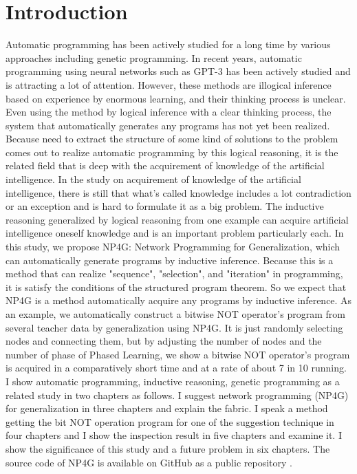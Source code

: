 \documentclass{article}
\begin{document}
\section{Introduction}
Automatic programming has been actively studied for a long time by various approaches including genetic programming.
In recent years, automatic programming using neural networks such as GPT-3\cite{gpt3} has been actively studied and is attracting a lot of attention.
However, these methods are illogical inference based on experience by enormous learning, and their thinking process is unclear.
Even using the method by logical inference with a clear thinking process, the system that automatically generates any programs has not yet been realized. 
Because need to extract the structure of some kind of solutions to the problem comes out to realize automatic programming by this logical reasoning, it is the related field that is deep with the acquirement of knowledge of the artificial intelligence.
In the study on acquirement of knowledge of the artificial intelligence, there is still that what's called knowledge includes a lot contradiction or an exception and is hard to formulate it as a big problem.
The inductive reasoning generalized by logical reasoning from one example can acquire artificial intelligence oneself knowledge and is an important problem particularly each.
In this study, we propose NP4G: Network Programming for Generalization, which can automatically generate programs by inductive inference.
Because this is a method that can realize "sequence", "selection", and "iteration" in programming, it is satisfy the conditions of the structured program theorem. So we expect that NP4G is a method automatically acquire any programs by inductive inference.
As an example, we automatically construct a bitwise NOT operator's program from several teacher data by generalization using NP4G.
It is just randomly selecting nodes and connecting them, but by adjusting the number of nodes and the number of phase of Phased Learning, we show a bitwise NOT operator's program is acquired in a comparatively short time and at a rate of about 7 in 10 running.
I show automatic programming, inductive reasoning, genetic programming as a related study in two chapters as follows.
I suggest network programming (NP4G) for generalization in three chapters and explain the fabric.
I speak a method getting the bit NOT operation program for one of the suggestion technique in four chapters and I show the inspection result in five chapters and examine it.
I show the significance of this study and a future problem in six chapters.
The source code of NP4G is available on GitHub as a public repository \footnotemark[1]. 
\end{document}
